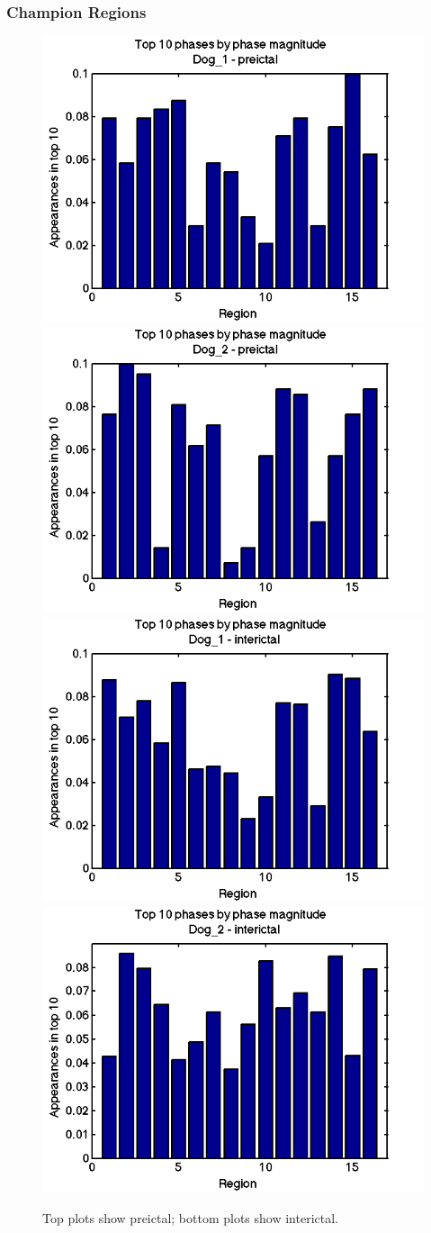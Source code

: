 \documentclass[11pt]{article}
\begin{document}
\subsubsection{Champion Regions}
\begin{figure}[H]
\centering
\includegraphics[width=.49\textwidth]{pictures/phaseHist_pre1.png}
\includegraphics[width=.49\textwidth]{pictures/phaseHist_pre2.png}
\includegraphics[width=.49\textwidth]{pictures/phaseHist_inter1.png}
\includegraphics[width=.49\textwidth]{pictures/phaseHist_inter2.png}
\caption{Top plots show preictal; bottom plots show interictal.}
\end{figure}
\end{document}
